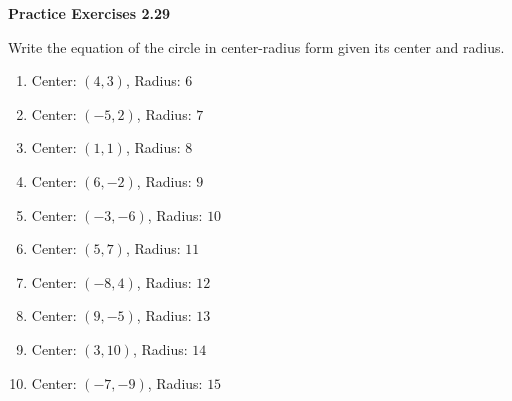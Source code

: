 \vspace{0.3ex}
\noindent\textbf{Practice Exercises 2.29}

\vspace{0.2ex}

Write the equation of the circle in center-radius form given its center and radius.
\begin{multicols}{2}
\begin{enumerate}
    \item Center: $(4,3)$, Radius: $6$
    \item Center: $(-5,2)$, Radius: $7$
    \item Center: $(1,1)$, Radius: $8$
    \item Center: $(6,-2)$, Radius: $9$
    \item Center: $(-3,-6)$, Radius: $10$
    \item Center: $(5,7)$, Radius: $11$
    \item Center: $(-8,4)$, Radius: $12$
    \item Center: $(9,-5)$, Radius: $13$
    \item Center: $(3,10)$, Radius: $14$
    \item Center: $(-7,-9)$, Radius: $15$
\end{enumerate}
\end{multicols}
